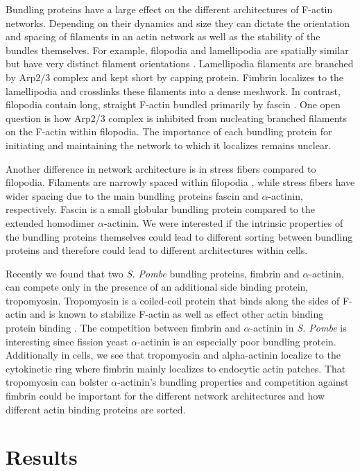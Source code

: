 Bundling proteins have a large effect on the different architectures of 
F-actin networks. Depending on their dynamics and size they can dictate 
the orientation and spacing of filaments in an actin network as well as 
the stability of the bundles themselves. For example, filopodia and lamellipodia are spatially similar but have very distinct filament orientations \citep{blanchoin_actin_2014}. Lamellipodia filaments are branched by Arp2/3 complex and kept short by capping protein. Fimbrin localizes to the lamellipodia and crosslinks these filaments into a dense meshwork. In contrast, filopodia contain long, straight F-actin bundled primarily by fascin \citep{vignjevic_role_2006}. One open question is how Arp2/3 complex is inhibited from nucleating branched filaments on the F-actin within filopodia. The importance of each bundling protein for initiating and maintaining the network to which it localizes remains unclear. 

Another difference in network architecture is in stress fibers compared to filopodia. Filaments are narrowly spaced within filopodia \citep{mattila_filopodia:_2008}, while stress 
fibers have wider spacing due to the main bundling proteins fascin and 
$\alpha$-actinin, respectively. Fascin is a small globular bundling protein compared to the extended homodimer $\alpha$-actinin. We were interested if the intrinsic properties of the bundling proteins themselves could lead to different sorting between bundling proteins and therefore could lead to different architectures within cells. 

Recently we found that two \textit{S. Pombe} bundling proteins, fimbrin and $\alpha$-actinin, can compete only in the presence of an additional side binding protein, tropomyosin. Tropomyosin is a coiled-coil protein that binds along the sides of F-actin and is known to stabilize F-actin as well as effect other actin binding protein binding \citep{perry_vertebrate_2001}. The competition between fimbrin and $\alpha$-actinin in \textit{S. Pombe} is interesting since fission yeast $\alpha$-actinin is an especially poor bundling protein. Additionally in cells, we see that tropomyosin and alpha-actinin localize to the cytokinetic ring where fimbrin mainly localizes to endocytic actin patches. That tropomyosin can bolster $\alpha$-actinin’s bundling properties and competition against fimbrin could be important for the different network architectures and how different actin binding proteins are sorted. 

\section{Results}\label{bundlers-results}


